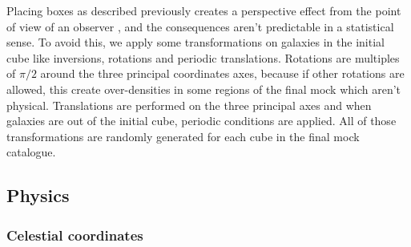 Placing boxes as described previously creates a perspective effect from the
point of view of an observer \citep{Blaizot+05}, and the consequences aren't
predictable in a statistical sense. To avoid this, we apply some
transformations on galaxies in the initial cube like inversions, rotations and
periodic translations. Rotations are multiples of $\pi/2$ around the three
principal coordinates axes, because if other rotations are allowed, this create
over-densities in some regions of the final mock which aren't physical.
Translations are performed on the three principal axes and when galaxies are
out of the initial cube, periodic conditions are applied. All of those
transformations are randomly generated for each cube in the final mock
catalogue.

\subsection{Physics}

\subsubsection{Celestial coordinates}

